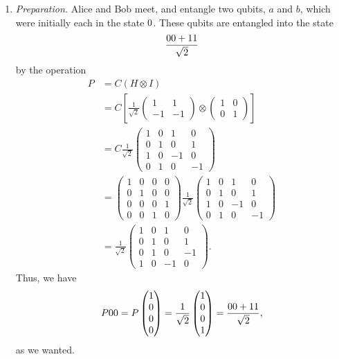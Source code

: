 \documentclass[12pt]{amsart}
\let\ket\relax
\newcommand*{\tensor}{\otimes}
\begin{document}
\begin{enumerate}
  \item \emph{Preparation.}  Alice and Bob meet, and entangle two qubits, $a$
    and $b$, which were initially each in the state $\ket{0}$.  These qubits
    are entangled into the state \[ \frac{\ket{00} + \ket{11}}{\sqrt{2}} \] by
    the operation
    \begin{align*}
      P
      &= C(H \tensor I) \\
      &= C
         \left[ \frac{1}{\sqrt{2}}
                \begin{pmatrix} 1 & 1 \\ -1 & -1 \end{pmatrix}
                \tensor
                \begin{pmatrix} 1 & 0 \\  0 &  1 \end{pmatrix} \right] \\
      &= C
         \frac{1}{\sqrt{2}}
         \begin{pmatrix}
           1 & 0 &  1 &  0 \\
           0 & 1 &  0 &  1 \\
           1 & 0 & -1 &  0 \\
           0 & 1 &  0 & -1
         \end{pmatrix} \\
      &= \begin{pmatrix}
           1 & 0 & 0 & 0 \\
           0 & 1 & 0 & 0 \\
           0 & 0 & 0 & 1 \\
           0 & 0 & 1 & 0
         \end{pmatrix}
         \frac{1}{\sqrt{2}}
         \begin{pmatrix}
           1 & 0 &  1 &  0 \\
           0 & 1 &  0 &  1 \\
           1 & 0 & -1 &  0 \\
           0 & 1 &  0 & -1
         \end{pmatrix} \\
      &= \frac{1}{\sqrt{2}}
         \begin{pmatrix}
           1 & 0 &  1 &  0 \\
           0 & 1 &  0 &  1 \\
           0 & 1 &  0 & -1 \\
           1 & 0 & -1 &  0
         \end{pmatrix}.
    \end{align*}
    Thus, we have \[ P\ket{00} = P\begin{pmatrix} 1 \\ 0 \\ 0 \\ 0 \end{pmatrix}
    = \frac{1}{\sqrt{2}} \begin{pmatrix} 1 \\ 0 \\ 0 \\ 1 \end{pmatrix} =
    \frac{\ket{00} + \ket{11}}{\sqrt{2}}, \] as we wanted.


\end{enumerate}
\end{document}
